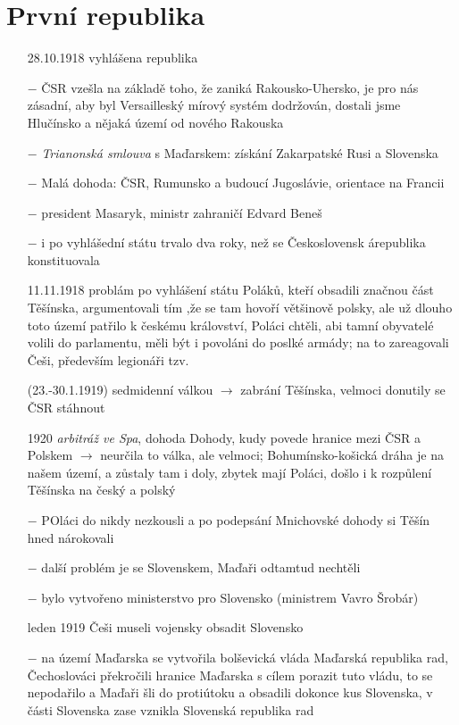 \documentclass{article}
\begin{document}
\section*{První republika}
\begin{itemize}
    \vspace{-0.5em}
    \setlength\itemsep{0.15em}
    \item[28.10.1918] vyhlášena republika
    \item[$-$] ČSR vzešla na základě toho, že zaniká Rakousko-Uhersko, je pro nás zásadní, aby byl Versailleský mírový systém dodržován, dostali jsme Hlučínsko a nějaká území od nového Rakouska
    \item[$-$] \textit{Trianonská smlouva} s Maďarskem: získání Zakarpatské Rusi a Slovenska
    \item[$-$] Malá dohoda: ČSR, Rumunsko a budoucí Jugoslávie, orientace na Francii
    \item[$-$] president Masaryk, ministr zahraničí Edvard Beneš
    \item[$-$] i po vyhlášední státu trvalo dva roky, než se Československ árepublika konstituovala
    \item[11.11.1918] problám po vyhlášení státu Poláků, kteří obsadili značnou část Těšínska, argumentovali tím ,že se tam hovoří většinově polsky, ale už dlouho toto území patřilo k českému království, Poláci chtěli, abi tamní obyvatelé volili do parlamentu, měli být i povoláni do poslké armády; na to zareagovali Češi, především legionáři tzv.
    \item[(23.-30.1.1919)] {\Kapitan sedmidenní válkou} $\rightarrow$ zabrání Těšínska, velmoci donutily se ČSR stáhnout
    \item[1920] \textit{arbitráž ve Spa}, dohoda Dohody, kudy povede hranice mezi ČSR a Polskem $\rightarrow$ neurčila to válka, ale velmoci; Bohumínsko-košická dráha je na našem území, a zůstaly tam i doly, zbytek mají Poláci, došlo i k rozpůlení Těšínska na český a polský
    \item[$-$] POláci do nikdy nezkousli a po podepsání Mnichovské dohody si Těšín hned nárokovali
    \item[$-$] další problém je se Slovenskem, Maďaři odtamtud nechtěli
    \item[$-$] bylo vytvořeno ministerstvo pro Slovensko (ministrem Vavro Šrobár)
    \item[leden 1919] Češi museli vojensky obsadit Slovensko
    \item[$-$] na území Maďarska se vytvořila bolševická vláda Maďarská republika rad, Čechoslováci překročili hranice Maďarska s cílem porazit tuto vládu, to se nepodařilo a Maďaři šli do protiútoku a obsadili dokonce kus Slovenska, v části Slovenska zase vznikla Slovenská republika rad

\end{itemize}
\end{document}
